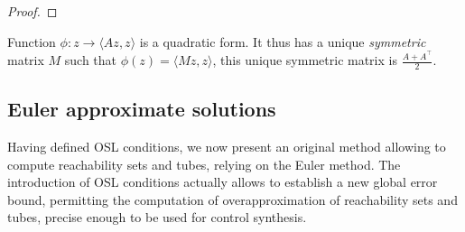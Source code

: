 \begin{proof}

\end{proof}


\begin{remark}
 Function $\phi: z \longrightarrow \langle Az, z \rangle$ is a quadratic form.
 It thus has a unique {\em symmetric} matrix $M$ such that $\phi(z) = \langle Mz,z \rangle$, 
 this unique symmetric matrix is $\frac{A + A^\top}{2}$.
\end{remark}







\subsection{Euler approximate solutions}

Having defined OSL conditions, we now present an original method allowing 
to compute reachability sets and tubes, relying on the Euler method.
The introduction of OSL conditions actually allows to establish a
new global error bound, permitting the computation of overapproximation
of reachability sets and tubes, precise enough to be used for control synthesis. 


